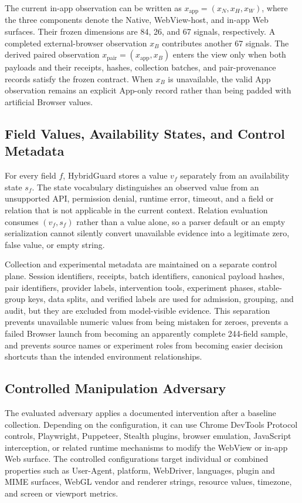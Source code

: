 The current in-app observation can be written as $x_{\mathrm{app}}=(x_N,x_H,x_W)$, where the three components denote the Native, WebView-host, and in-app Web surfaces. Their frozen dimensions are 84, 26, and 67 signals, respectively. A completed external-browser observation $x_B$ contributes another 67 signals. The derived paired observation $x_{\mathrm{pair}}=(x_{\mathrm{app}},x_B)$ enters the \pairedfp view only when both payloads and their receipts, hashes, collection batches, and pair-provenance records satisfy the frozen contract. When $x_B$ is unavailable, the valid App observation remains an explicit App-only record rather than being padded with artificial Browser values.

\subsection{Field Values, Availability States, and Control Metadata}

For every field $f$, HybridGuard stores a value $v_f$ separately from an availability state $s_f$. The state vocabulary distinguishes an observed value from an unsupported API, permission denial, runtime error, timeout, and a field or relation that is not applicable in the current context. Relation evaluation consumes $(v_f,s_f)$ rather than a value alone, so a parser default or an empty serialization cannot silently convert unavailable evidence into a legitimate zero, false value, or empty string.

Collection and experimental metadata are maintained on a separate control plane. Session identifiers, receipts, batch identifiers, canonical payload hashes, pair identifiers, provider labels, intervention tools, experiment phases, stable-group keys, data splits, and verified labels are used for admission, grouping, and audit, but they are excluded from model-visible evidence. This separation prevents unavailable numeric values from being mistaken for zeroes, prevents a failed Browser launch from becoming an apparently complete 244-field sample, and prevents source names or experiment roles from becoming easier decision shortcuts than the intended environment relationships.

\subsection{Controlled Manipulation Adversary}

The evaluated adversary applies a documented intervention after a baseline collection. Depending on the configuration, it can use Chrome DevTools Protocol controls, Playwright, Puppeteer, Stealth plugins, browser emulation, JavaScript interception, or related runtime mechanisms to modify the WebView or in-app Web surface. The controlled configurations target individual or combined properties such as User-Agent, platform, WebDriver, languages, plugin and MIME surfaces, WebGL vendor and renderer strings, resource values, timezone, and screen or viewport metrics.

